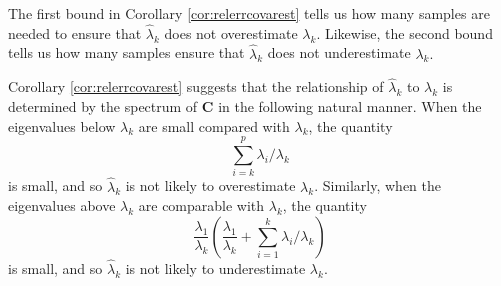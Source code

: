 \documentclass[11pt,letterpaper,twoside,reqno,nosumlimits]{amsart}
\newcommand{\mat}[1]{\ensuremath{\bm{#1}}} %
\theoremstyle{remark}
\numberwithin{equation}{section}
\numberwithin{thm}{section}
\numberwithin{prop}{section}
\numberwithin{defn}{section}
\numberwithin{remark}{section}
\begin{document}
The first bound in Corollary \ref{cor:relerrcovarest} tells us how many samples are needed to ensure that $\hat{\lambda}_k$ does not overestimate $\lambda_k.$ Likewise, the second bound tells us how many samples ensure that $\hat{\lambda}_k$ does not underestimate $\lambda_k.$


Corollary \ref{cor:relerrcovarest} suggests that the relationship of $\hat{\lambda}_k$ to $\lambda_k$ is determined by the spectrum of $\mat{C}$ in the following natural manner. When the eigenvalues below $\lambda_k$ are small compared with $\lambda_k$, the quantity
\[
 \sum_{i=k}^p \lambda_i/\lambda_k
\]
is small, and so $\hat{\lambda}_k$ is not likely to overestimate $\lambda_k$. Similarly, when the eigenvalues above $\lambda_k$ are comparable with $\lambda_k$, the quantity
\[
\frac{\lambda_1}{\lambda_k}\left( \frac{\lambda_1}{\lambda_k} + \sum_{i=1}^k \lambda_i/\lambda_k  \right)
\]
is small, and so $\hat{\lambda}_k$ is not likely to underestimate $\lambda_k$.
\end{document}
